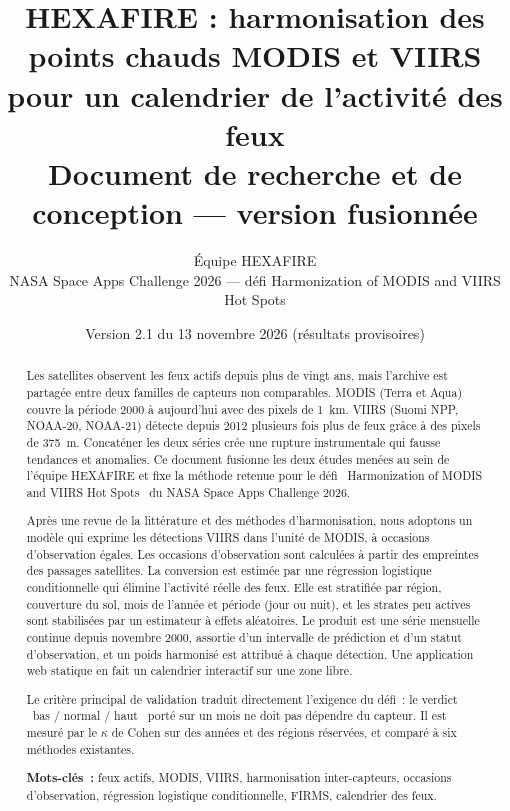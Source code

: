 \documentclass[11pt,a4paper]{article}
\title{\textbf{HEXAFIRE : harmonisation des points chauds MODIS et VIIRS\\pour un calendrier de l'activité des feux}\\[4pt]\large Document de recherche et de conception --- version fusionnée}
\author{Équipe HEXAFIRE\\[2pt]\small NASA Space Apps Challenge 2026 --- défi \og Harmonization of MODIS and VIIRS Hot Spots\fg}
\date{Version 2.1 du 13 novembre 2026 (résultats provisoires)}
\newcommand{\og}{\guillemotleft~}
\newcommand{\fg}{~\guillemotright}
\begin{document}
\maketitle

\begin{abstract}
\noindent Les satellites observent les feux actifs depuis plus de vingt ans, mais l'archive est partagée entre deux familles de capteurs non comparables. MODIS (Terra et Aqua) couvre la période 2000 à aujourd'hui avec des pixels de 1~km. VIIRS (Suomi NPP, NOAA-20, NOAA-21) détecte depuis 2012 plusieurs fois plus de feux grâce à des pixels de 375~m. Concaténer les deux séries crée une rupture instrumentale qui fausse tendances et anomalies. Ce document fusionne les deux études menées au sein de l'équipe HEXAFIRE et fixe la méthode retenue pour le défi \og Harmonization of MODIS and VIIRS Hot Spots\fg{} du NASA Space Apps Challenge 2026.

Après une revue de la littérature et des méthodes d'harmonisation, nous adoptons un modèle qui exprime les détections VIIRS dans l'unité de MODIS, à occasions d'observation égales. Les occasions d'observation sont calculées à partir des empreintes des passages satellites. La conversion est estimée par une régression logistique conditionnelle qui élimine l'activité réelle des feux. Elle est stratifiée par région, couverture du sol, mois de l'année et période (jour ou nuit), et les strates peu actives sont stabilisées par un estimateur à effets aléatoires. Le produit est une série mensuelle continue depuis novembre 2000, assortie d'un intervalle de prédiction et d'un statut d'observation, et un poids harmonisé est attribué à chaque détection. Une application web statique en fait un calendrier interactif sur une zone libre.

Le critère principal de validation traduit directement l'exigence du défi~: le verdict \og bas / normal / haut\fg{} porté sur un mois ne doit pas dépendre du capteur. Il est mesuré par le $\kappa$ de Cohen sur des années et des régions réservées, et comparé à six méthodes existantes.

\medskip\noindent\textbf{Mots-clés~:} feux actifs, MODIS, VIIRS, harmonisation inter-capteurs, occasions d'observation, régression logistique conditionnelle, FIRMS, calendrier des feux.
\end{abstract}
\end{document}
